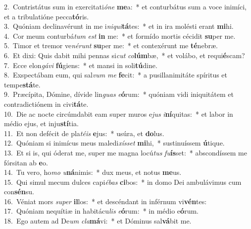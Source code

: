 {2.~}Contristátus sum in exercitati\textit{ó}\textit{ne} \textbf{me}a:~* et conturbátus sum a voce inimíci, et a tribulatióne pecca\textbf{tó}ris.\\
{3.~}Quóniam declinavérunt in me i\textit{ni}\textit{qui}\textbf{tá}tes:~* et in ira molésti erant \textbf{mi}hi.\\
{4.~}Cor meum conturbá\textit{tum} \textit{est} \textbf{in} me:~* et formído mortis cécidit \textbf{su}per me.\\
{5.~}Timor et tremor ve\textit{né}\textit{runt} \textbf{su}per me:~* et contexérunt me \textbf{té}nebræ.\\
{6.~}Et dixi: Quis dabit mihi pennas si\textit{cut} \textit{co}\textbf{lúm}bæ,~* et volábo, et requi\textbf{é}scam?\\
{7.~}Ecce elon\textit{gá}\textit{vi} \textbf{fú}giens:~* et mansi in soli\textbf{tú}dine.\\
{8.~}Exspectábam eum, qui sal\textit{vum} \textit{me} \textbf{fe}cit:~* a pusillanimitáte spíritus et tempe\textbf{stá}te.\\
{9.~}Præcípita, Dómine, dívide lin\textit{guas} \textit{e}\textbf{ó}rum:~* quóniam vidi iniquitátem et contradictiónem in civi\textbf{tá}te.\\
{10.~}Die ac nocte circúmdabit eam super muros e\textit{jus} \textit{i}\textbf{ní}quitas:~* et labor in médio ejus, et inju\textbf{stí}tia.\\
{11.~}Et non defécit de pla\textit{té}\textit{is} \textbf{e}jus:~* usúra, et \textbf{do}lus.\\
{12.~}Quóniam si inimícus meus maledi\textit{xís}\textit{set} \textbf{mi}hi,~* sustinuíssem \textbf{ú}tique.\\
{13.~}Et si is, qui óderat me, super me magna locú\textit{tus} \textit{fu}\textbf{ís}set:~* abscondíssem me fórsitan ab \textbf{e}o.\\
{14.~}Tu vero, ho\textit{mo} \textit{u}\textbf{ná}nimis:~* dux meus, et notus \textbf{me}us.\\
{15.~}Qui simul mecum dulces capi\textit{é}\textit{bas} \textbf{ci}bos:~* in domo Dei ambulávimus cum con\textbf{sén}su.\\
{16.~}Véniat mors \textit{su}\textit{per} \textbf{il}los:~* et descéndant in inférnum vi\textbf{vén}tes:\\
{17.~}Quóniam nequítiæ in habitácu\textit{lis} \textit{e}\textbf{ó}rum:~* in médio e\textbf{ó}rum.\\
{18.~}Ego autem ad De\textit{um} \textit{cla}\textbf{má}vi:~* et Dóminus sal\textbf{vá}bit me.\\
